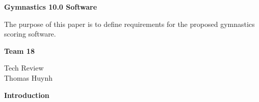 \documentclass[letterpaper,10pt,draftclsnofoot,onecolumn,]{IEEEtran}
\begin{document}
\begin{titlepage}
    \begin{center}
        \vspace*{1cm}
        
        \textbf{Gymnastics 10.0 Software }
        
        \vspace{0.5cm}
        The purpose of this paper is to define requirements for the proposed gymnastics scoring software.
        
        \vspace{1.5cm}
        
        \textbf{Team 18}
        
        Tech Review\\
        Thomas Huynh\\


    \end{center}
\end{titlepage}


\begin{center}
\textbf{Introduction}\\
\end{center}
\end{document}

